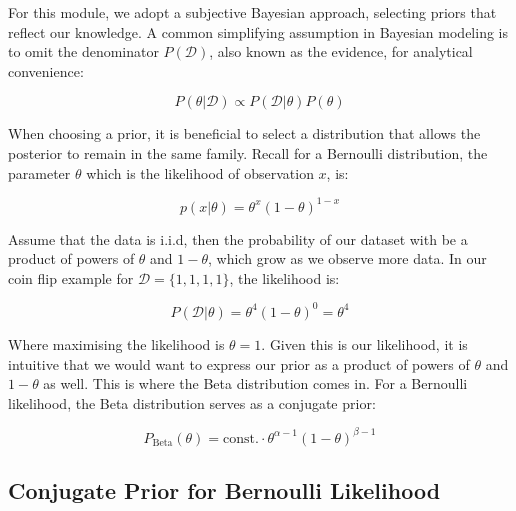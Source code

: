 For this module, we adopt a subjective Bayesian approach, selecting priors that reflect our knowledge. A common simplifying assumption in Bayesian modeling is to omit the denominator \( P(\mathcal{D}) \), also known as the evidence, for analytical convenience:

\[
    P(\theta|\mathcal{D}) \propto P(\mathcal{D}|\theta)P(\theta)
\]


When choosing a prior, it is beneficial to select a distribution that allows the posterior to remain in the same family. Recall for a Bernoulli distribution, the parameter $\theta$ which is the likelihood of observation $x$, is:

\[
    p(x|\theta) = \theta^x(1-\theta)^{1-x}
\]

Assume that the data is i.i.d, then the probability of our dataset with be a product of powers of $\theta$ and $1-\theta$, which grow as we observe more data. In our coin flip example for  \( \mathcal{D} = \{1, 1, 1, 1\} \), the likelihood is:

\[
    P(\mathcal{D}|\theta) = \theta^4(1 - \theta)^0 = \theta^4
\]

Where maximising the likelihood is $\theta = 1$. Given this is our likelihood, it is intuitive that we would want to express our prior as a product of powers of $\theta$ and $1-\theta$ as well. This is where the Beta distribution comes in. For a Bernoulli likelihood, the Beta distribution serves as a conjugate prior:

\[
    P_{\mathrm{Beta}}(\theta) = \text{const.} \cdot \theta^{\alpha - 1}(1 - \theta)^{\beta - 1}
\]


\subsection{Conjugate Prior for Bernoulli Likelihood}\label{sec:conjugate_ridge}

